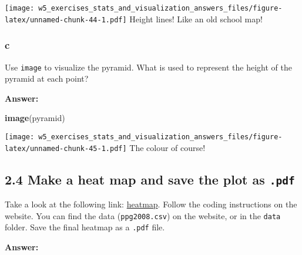 \documentclass[]{article}
\newenvironment{Shaded}{\begin{snugshade}}{\end{snugshade}}
\newcommand{\DataTypeTok}[1]{\textcolor[rgb]{0.13,0.29,0.53}{#1}}
\newcommand{\DecValTok}[1]{\textcolor[rgb]{0.00,0.00,0.81}{#1}}
\newcommand{\KeywordTok}[1]{\textcolor[rgb]{0.13,0.29,0.53}{\textbf{#1}}}
\newcommand{\NormalTok}[1]{#1}
\newcommand{\OperatorTok}[1]{\textcolor[rgb]{0.81,0.36,0.00}{\textbf{#1}}}
\newcommand{\OtherTok}[1]{\textcolor[rgb]{0.56,0.35,0.01}{#1}}
\newcommand{\StringTok}[1]{\textcolor[rgb]{0.31,0.60,0.02}{#1}}
\begin{document}
\texttt{[image: w5\_exercises\_stats\_and\_visualization\_answers\_files/figure-latex/unnamed-chunk-44-1.pdf]}
Height lines! Like an old school map!

\hypertarget{c-8}{%
\subsubsection{c}\label{c-8}}

Use \texttt{image} to visualize the pyramid. What is used to represent
the height of the pyramid at each point?

\textbf{Answer:}

\begin{Shaded}
\begin{Highlighting}[]
\KeywordTok{image}\NormalTok{(pyramid)}
\end{Highlighting}
\end{Shaded}

\texttt{[image: w5\_exercises\_stats\_and\_visualization\_answers\_files/figure-latex/unnamed-chunk-45-1.pdf]}
The colour of course!

\hypertarget{make-a-heat-map-and-save-the-plot-as-.pdf}{%
\subsection{\texorpdfstring{2.4 Make a heat map and save the plot as
\texttt{.pdf}}{2.4 Make a heat map and save the plot as .pdf}}\label{make-a-heat-map-and-save-the-plot-as-.pdf}}

Take a look at the following link:
\href{http://flowingdata.com/2010/01/21/how-to-make-a-heatmap-a-quick-and-easy-solution/}{heatmap}.
Follow the coding instructions on the website. You can find the data
(\texttt{ppg2008.csv}) on the website, or in the \texttt{data} folder.
Save the final heatmap as a \texttt{.pdf} file.

\textbf{Answer:}

\begin{Shaded}
\end{Shaded}
\end{document}
